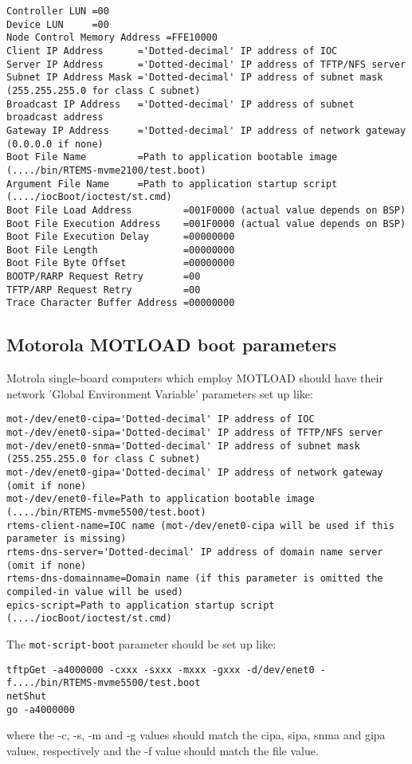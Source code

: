 \begin{verbatim}Controller LUN =00
Device LUN     =00
Node Control Memory Address =FFE10000
Client IP Address      ='Dotted-decimal' IP address of IOC
Server IP Address      ='Dotted-decimal' IP address of TFTP/NFS server
Subnet IP Address Mask ='Dotted-decimal' IP address of subnet mask (255.255.255.0 for class C subnet)
Broadcast IP Address   ='Dotted-decimal' IP address of subnet broadcast address
Gateway IP Address     ='Dotted-decimal' IP address of network gateway (0.0.0.0 if none)
Boot File Name         =Path to application bootable image (..../bin/RTEMS-mvme2100/test.boot)
Argument File Name     =Path to application startup script (..../iocBoot/ioctest/st.cmd)
Boot File Load Address         =001F0000 (actual value depends on BSP)
Boot File Execution Address    =001F0000 (actual value depends on BSP)
Boot File Execution Delay      =00000000
Boot File Length               =00000000
Boot File Byte Offset          =00000000
BOOTP/RARP Request Retry       =00
TFTP/ARP Request Retry         =00
Trace Character Buffer Address =00000000
\end{verbatim}\subsection{Motorola MOTLOAD boot parameters}

Motrola single-board computers which employ MOTLOAD should have their network 'Global Environment Variable' 
parameters set up like:

\begin{verbatim}mot-/dev/enet0-cipa='Dotted-decimal' IP address of IOC
mot-/dev/enet0-sipa='Dotted-decimal' IP address of TFTP/NFS server
mot-/dev/enet0-snma='Dotted-decimal' IP address of subnet mask (255.255.255.0 for class C subnet)
mot-/dev/enet0-gipa='Dotted-decimal' IP address of network gateway (omit if none)
mot-/dev/enet0-file=Path to application bootable image (..../bin/RTEMS-mvme5500/test.boot)
rtems-client-name=IOC name (mot-/dev/enet0-cipa will be used if this parameter is missing)
rtems-dns-server='Dotted-decimal' IP address of domain name server (omit if none)
rtems-dns-domainname=Domain name (if this parameter is omitted the compiled-in value will be used)
epics-script=Path to application startup script (..../iocBoot/ioctest/st.cmd)
\end{verbatim}The \verb|mot-script-boot| parameter should be set up like:

\begin{verbatim}tftpGet -a4000000 -cxxx -sxxx -mxxx -gxxx -d/dev/enet0 -f..../bin/RTEMS-mvme5500/test.boot
netShut
go -a4000000
\end{verbatim}where the -c, -s, -m and -g values should match the cipa, sipa, snma and gipa values, respectively and the -f value should 
match the file value.

